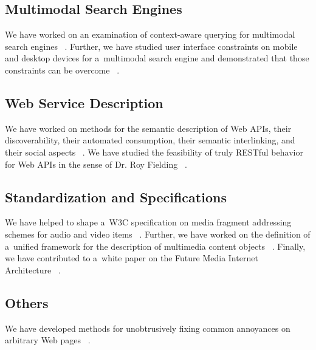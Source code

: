 \subsection{Multimodal Search Engines}

We have worked on an examination of context-aware querying
for multimodal search engines~%
\cite{etzold2012contextawarequerying,steiner2012isearch}.
Further, we have studied user interface constraints on
mobile and desktop devices for a~multimodal search engine
and demonstrated that those constraints can be overcome~%
\cite{steiner2012onesizedoesnotfitall}.


\subsection{Web Service Description}

We have worked on methods for the semantic description of Web APIs,
their discoverability, their automated consumption,
their semantic interlinking, and their social aspects~%
\cite{verborgh2011descriptionandinteraction,verborgh2011efficientruntime,verborgh2011integratingdata,verborgh2012capturingthefunctionality,verborgh2012functionalcomposition,verborgh2012functionaldescriptions,verborgh2012missinglinks,verborgh2012restdesc,verborgh2012socialdescriptionrevolution}.
We have studied the feasibility of truly RESTful behavior
for Web APIs in the sense of Dr. Roy Fielding~%
\cite{steiner2011fulfilling}.
        
\subsection{Standardization and Specifications}        
We have helped to shape a~W3C specification on media
fragment addressing schemes for audio and video items~%
\cite{troncy2012mediafragments}.
Further, we have worked on the definition of a~unified framework
for the description of multimedia content objects~%
\cite{axenopoulos2012isearch,daras2011unifiedframework}.
Finally, we have contributed to a~white paper on the
Future Media Internet Architecture~%
\cite{alduan2011futureinternet}.

\subsection{Others}

We have developed methods for unobtrusively fixing
common annoyances on arbitrary Web pages~%
\cite{steiner2012xkcd37}.

